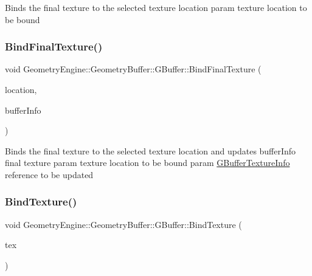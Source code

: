 Binds the final texture to the selected texture location param texture location to be bound \mbox{\label{class_geometry_engine_1_1_geometry_buffer_1_1_g_buffer_a710627a05fa69f6aa98ee6d90ab57e85}} 
\subsubsection{\texorpdfstring{BindFinalTexture()}{BindFinalTexture()}\hspace{0.1cm}{\footnotesize\ttfamily [2/2]}}
{\footnotesize\ttfamily void Geometry\+Engine\+::\+Geometry\+Buffer\+::\+G\+Buffer\+::\+Bind\+Final\+Texture (\begin{DoxyParamCaption}\item[{\mbox{\hyperlink{class_geometry_engine_1_1_geometry_buffer_1_1_g_buffer_a718dceafcac1915f7de061108597e1cc}{G\+B\+U\+F\+F\+E\+R\+\_\+\+T\+E\+X\+T\+U\+R\+E\+\_\+\+T\+Y\+PE}}}]{location,  }\item[{\mbox{\hyperlink{struct_geometry_engine_1_1_g_buffer_texture_info}{G\+Buffer\+Texture\+Info}} \&}]{buffer\+Info }\end{DoxyParamCaption})}

Binds the final texture to the selected texture location and updates buffer\+Info final texture param texture location to be bound param \mbox{\hyperlink{struct_geometry_engine_1_1_g_buffer_texture_info}{G\+Buffer\+Texture\+Info}} reference to be updated \mbox{\label{class_geometry_engine_1_1_geometry_buffer_1_1_g_buffer_a6a2469afe0c79b97d35ba5d2b6a1ae52}} 
\subsubsection{\texorpdfstring{BindTexture()}{BindTexture()}}
{\footnotesize\ttfamily void Geometry\+Engine\+::\+Geometry\+Buffer\+::\+G\+Buffer\+::\+Bind\+Texture (\begin{DoxyParamCaption}\item[{\mbox{\hyperlink{class_geometry_engine_1_1_geometry_buffer_1_1_g_buffer_a718dceafcac1915f7de061108597e1cc}{G\+B\+U\+F\+F\+E\+R\+\_\+\+T\+E\+X\+T\+U\+R\+E\+\_\+\+T\+Y\+PE}}}]{tex }\end{DoxyParamCaption})}

